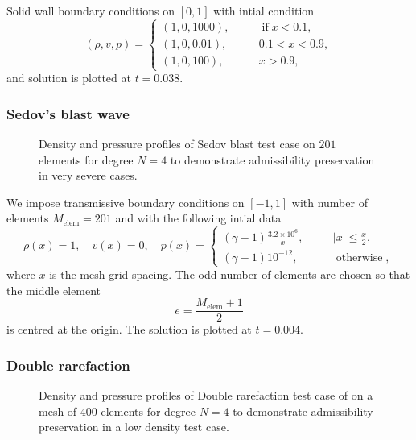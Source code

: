 \documentclass{beamer}
\newcommand{\tmop}[1]{\ensuremath{\operatorname{#1}}}
\begin{document}
{{\begin{frame}
  Solid wall boundary conditions on $[0, 1]$ with intial condition
  \[ (\rho, v, p) = \left\{\begin{array}{lll}
       (1, 0, 1000), & \quad & \tmop{if} x < 0.1,\\
       (1, 0, 0.01), &  & 0.1 < x < 0.9,\\
       (1, 0, 100), &  & x > 0.9,
     \end{array}\right. \]
  and solution is plotted at $t = 0.038$.
\end{frame}}{\begin{frame}
  \frametitle{Sedov's blast wave}
  
  \begin{figure}[h]
    \caption{Density and pressure profiles of Sedov blast test case
    {\cite{SEDOV1959146}} on $201$ elements for degree $N = 4$ to demonstrate
    admissibility preservation in very severe cases.}
  \end{figure}
  
  We impose transmissive boundary conditions on $[- 1, 1]$ with number of
  elements $M_{\tmop{elem}} = 201$ and with the following intial data
  \[ \rho (x) = 1, \quad v (x) = 0, \quad p (x) = \left\{\begin{array}{lll}
       (\gamma - 1) \frac{3.2 \times 10^6}{x}, & \quad & | x | \leq
       \frac{x}{2},\\
       (\gamma - 1) 10^{- 12}, &  & \tmop{otherwise},
     \end{array}\right. \]
  where $x$ is the mesh grid spacing. The odd number of elements are chosen so
  that the middle element
  \[ e = \frac{M_{\tmop{elem}} + 1}{2} \]
  is centred at the origin. The solution is plotted at $t = 0.004$.
\end{frame}}{\begin{frame}
  \frametitle{Double rarefaction}
  
  \begin{figure}[h]
    \caption{Density and pressure profiles of Double rarefaction test case of
    {\cite{Linde1997}} on a mesh of 400 elements for degree $N = 4$ to
    demonstrate admissibility preservation in a low density test case.}
  \end{figure}
  
  \
  

\end{frame}}}
\end{document}
